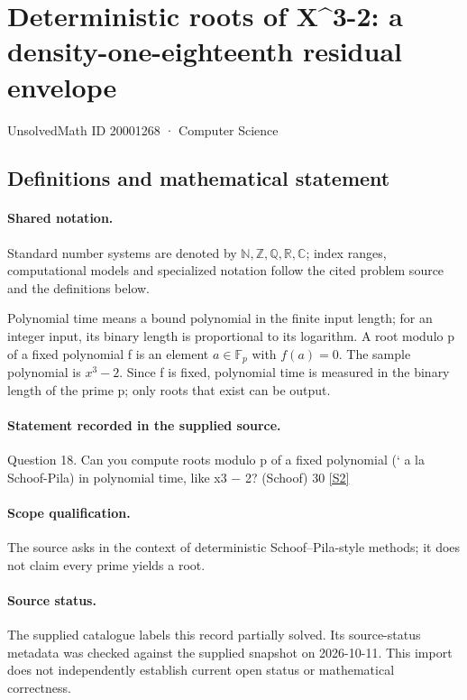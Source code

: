 \documentclass[11pt]{article}
\newcommand{\sref}[2]{\hyperlink{source:#1:#2}{[S#2]}}
\begin{document}
\setcounter{section}{20001267}
\section{Deterministic roots of X\textasciicircum{}3-2: a density-one-eighteenth residual envelope}\label{20001268}
{\small\sffamily UnsolvedMath ID 20001268 · Computer Science}
\subsection{Definitions and mathematical statement}

\paragraph{Shared notation.}Standard number systems are denoted by $\mathbb N,\mathbb Z,\mathbb Q,\mathbb R,\mathbb C$; index ranges, computational models and specialized notation follow the cited problem source and the definitions below.


Polynomial time means a bound polynomial in the finite input length; for an integer input, its binary length is proportional to its logarithm. A root modulo p of a fixed polynomial f is an element $a\in\mathbb F_p$ with $f(a)=0$. The sample polynomial is $x^3-2$. Since f is fixed, polynomial time is measured in the binary length of the prime p; only roots that exist can be output.
\paragraph{Statement recorded in the supplied source.}
Question 18. Can you compute roots modulo p of a fixed polynomial (` a la Schoof-Pila) in polynomial time, like x3 − 2? (Schoof) 30 \sref{20001268}{2}
\paragraph{Scope qualification.}
The source asks in the context of deterministic Schoof--Pila-style methods; it does not claim every prime yields a root.
\paragraph{Source status.}
The supplied catalogue labels this record partially solved. Its source-status metadata was checked against the supplied snapshot on 2026-10-11. This import does not independently establish current open status or mathematical correctness.
\end{document}
